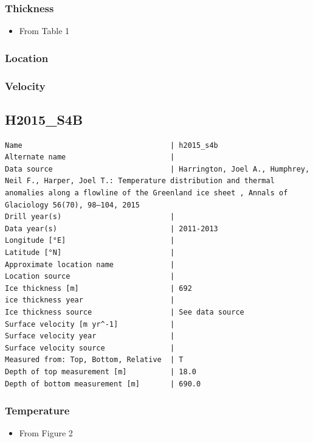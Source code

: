 \documentclass[article,a4paper,times,11pt,twoside]{article}
\begin{document}
\subsubsection{Thickness}
\label{sec:org3366d4f}

\begin{itemize}
\item From \textcite{harrington_2015} Table 1
\end{itemize}

\subsubsection{Location}
\label{sec:org377f167}

\subsubsection{Velocity}
\label{sec:org63b8858}
\clearpage
\subsection{H2015\_S4B}
\label{sec:org49cf996}
\begin{verbatim}
Name                                  | h2015_s4b
Alternate name                        | 
Data source                           | Harrington, Joel A., Humphrey, Neil F., Harper, Joel T.: Temperature distribution and thermal anomalies along a flowline of the Greenland ice sheet , Annals of Glaciology 56(70), 98–104, 2015 
Drill year(s)                         | 
Data year(s)                          | 2011-2013
Longitude [°E]                        | 
Latitude [°N]                         | 
Approximate location name             | 
Location source                       | 
Ice thickness [m]                     | 692
ice thickness year                    | 
Ice thickness source                  | See data source
Surface velocity [m yr^-1]            | 
Surface velocity year                 | 
Surface velocity source               | 
Measured from: Top, Bottom, Relative  | T
Depth of top measurement [m]          | 18.0
Depth of bottom measurement [m]       | 690.0
\end{verbatim}

\subsubsection{Temperature}
\label{sec:org50f2e53}

\begin{itemize}
\item From \textcite{harrington_2015} Figure 2
\end{itemize}
\end{document}
